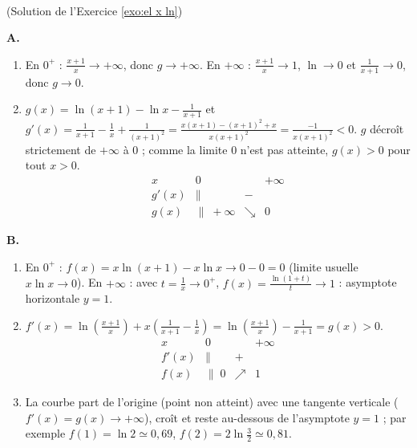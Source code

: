 \begin{corrige}
\begin{sol} ~ \\
(Solution de l'Exercice \ref{exo:el x ln})

\textbf{A.}
\begin{enumerate}
\item En $0^+$ : $\frac{x+1}{x} \to +\infty$, donc $g \to +\infty$. En $+\infty$ : $\frac{x+1}{x} \to 1$, $\ln \to 0$ et $\frac{1}{x+1} \to 0$, donc $g \to 0$.
\item $g(x) = \ln(x+1) - \ln x - \frac{1}{x+1}$ et
      $g'(x) = \frac{1}{x+1} - \frac{1}{x} + \frac{1}{(x+1)^2} = \frac{x(x+1) - (x+1)^2 + x}{x(x+1)^2} = \frac{-1}{x(x+1)^2} < 0$.
      $g$ d\'ecro\^it strictement de $+\infty$ \`a $0$ ; comme la limite $0$ n'est pas atteinte, $g(x) > 0$ pour tout $x > 0$.
      \[
      \begin{array}{c|ccc}
      x & 0 & & +\infty \\ \hline
      g'(x) & \| & - & \\ \hline
      g(x) & \| \; +\infty & \searrow & 0
      \end{array}
      \]
\end{enumerate}
\textbf{B.}
\begin{enumerate}
\item En $0^+$ : $f(x) = x\ln(x+1) - x\ln x \to 0 - 0 = 0$ (limite usuelle $x\ln x \to 0$).
      En $+\infty$ : avec $t = \frac{1}{x} \to 0^+$, $f(x) = \frac{\ln(1+t)}{t} \to 1$ : asymptote horizontale $y = 1$.
\item $f'(x) = \ln\left(\frac{x+1}{x}\right) + x\left(\frac{1}{x+1} - \frac{1}{x}\right) = \ln\left(\frac{x+1}{x}\right) - \frac{1}{x+1} = g(x) > 0$.
      \[
      \begin{array}{c|ccc}
      x & 0 & & +\infty \\ \hline
      f'(x) & \| & + & \\ \hline
      f(x) & \| \; 0 & \nearrow & 1
      \end{array}
      \]
\item La courbe part de l'origine (point non atteint) avec une tangente verticale ($f'(x) = g(x) \to +\infty$), cro\^it et reste
      au-dessous de l'asymptote $y = 1$ ; par exemple $f(1) = \ln 2 \simeq 0{,}69$, $f(2) = 2\ln\frac{3}{2} \simeq 0{,}81$.
\end{enumerate}
\end{sol}


\end{corrige}
